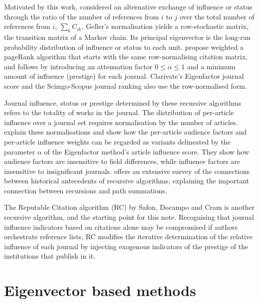 \documentclass[10pt]{article}
\begin{document}
Motivated by this work, \cite{gellerCitationInfluenceMethodology1978} considered an alternative exchange of influence or status through the ratio of the number of references from $i$ to $j$ over the total number of references from $i$, $\sum_k C_{ik}$. Geller's normalisation yields a row-stochastic matrix, the transition matrix of a Markov chain. Its principal eigenvector is the long-run probability distribution of influence or status to each unit. \cite{bollenJournalStatus2006a} propose weighted a pageRank algorithm that starts with the same row-normalising citation matrix, and follows \cite{pageMethodNodeRanking1998} by introducing an attenuation factor $0 \le \alpha \le 1$ and a minimum amount of influence (prestige) for each journal. Clarivate's Eigenfactor journal score \citep{bergstromEigenfactorMeasuringValue2007, westEigenfactorMetricsNetwork2010} and the Scimgo-Scopus journal ranking \citep{gonzalez-pereiraNewApproachMetric2010,guerrero-boteFurtherStepForward2012} also use the row-normalised form. 

Journal influence, status or prestige determined by these recursive algorithms refers to the totality of works in the journal. The distribution of per-article influence over a journal set requires normalisation by the number of articles. \cite{waltmanRelationEigenfactorAudience2010} explain these normalisations and show how the per-article audience factors and per-article influence weights can be regarded as variants delineated by the parameter $\alpha$ of the Eigenfactor method's article influence score. They show how audience factors are insensitive to field differences, while influence factors are insensitive to insignificant journals. \citep{vigna} offers an extensive survey of the connections between historical antecedents of recursive algorithms, explaining the important connection between recursions and path summations.

The Reputable Citation algorithm (RC) by Safon, Docampo and Cram \citep{safon2025}  is another recursive algorithm, and the starting point for this note. Recognising that journal influence indicators based on citations alone may be compromised if authors orchestrate reference lists, RC modifies the iterative determination of the relative influence of each journal by injecting exogenous indicators of the prestige of the institutions that publish in it.

\section{Eigenvector based methods}
\end{document}
